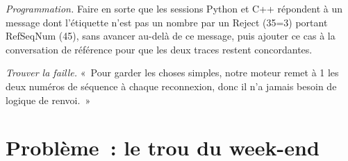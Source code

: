 \begin{exercise}[$\star\star\star$]\label{exo:ll:protocols-i-fix:7}
\emph{Programmation.} Faire en sorte que les sessions Python et C++ répondent à un message dont l'étiquette n'est pas un nombre par un Reject (35=3) portant
RefSeqNum (45), sans avancer au-delà de ce message, puis ajouter ce cas à la conversation de référence pour que les deux traces restent concordantes.
\end{exercise}

\begin{exercise}[$\star\star\star$]\label{exo:ll:protocols-i-fix:8}
\emph{Trouver la faille.} «~Pour garder les choses simples, notre moteur remet à 1 les deux numéros de séquence à chaque reconnexion, donc il n'a jamais
besoin de logique de renvoi.~»
\end{exercise}

\section{Problème~: le trou du week-end}

